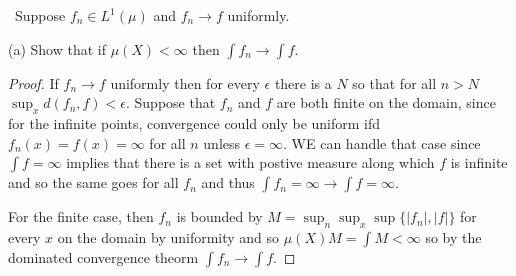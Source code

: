 \documentclass[11pt]{amsart}
\theoremstyle{definition}
\numberwithin{theorem}{section}
\numberwithin{definition}{section}
\numberwithin{equation}{section}
\begin{document}
\medskip {}\ Suppose $f_n \in L^1(\mu)$ and $f_n \to f$ uniformly.


(a) Show that if $\mu(X) < \infty$ then $\int f_n \to \int f.$
\begin{proof}
  If $f_n \to f$ uniformly then for every $\epsilon$ there is a $N$ so that for all $n>N$  $\sup_x d(f_n,f) < \epsilon$. Suppose that $f_n$ and $f$ are both finite on the domain, since for the infinite points, convergence could only be uniform ifd $f_n(x) = f(x) = \infty$ for all $n$ unless $\epsilon = \infty.$ WE can handle that case since $\int f = \infty$ implies that there is a set with postive measure along which $f$ is infinite and so the same goes for all $f_n$ and thus $\int f_n = \infty \to \int f = \infty.$


  For the finite case, then $f_n$ is bounded by $M = \sup_n \sup_x \sup\{|f_n|, |f|\}$ for every $x$ on the domain by uniformity and so $\mu(X)M = \int M < \infty$ so by the dominated convergence theorm $\int f_n \to \int f.$
\end{proof}
\end{document}
